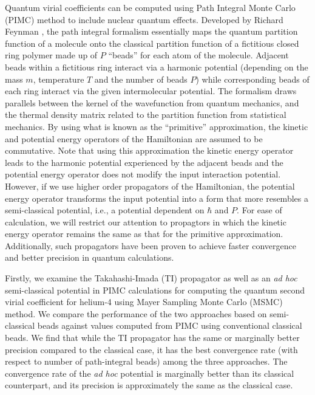 Quantum virial coefficients can be computed using Path Integral Monte Carlo (PIMC) method to include nuclear quantum effects. Developed by Richard Feynman \cite{Feynman}, the path integral formalism essentially maps the quantum partition function of a molecule onto the classical partition function of a fictitious closed ring polymer made up of $P$ ``beads'' for each atom of the molecule. Adjacent beads within a fictitious ring interact via a harmonic potential (depending on the mass $m$, temperature $T$ and the number of beads $P$) while corresponding beads of each ring interact via the given intermolecular potential. The formalism draws parallels between the kernel of the wavefunction from quantum mechanics, and the thermal density matrix related to the partition function from statistical mechanics. By using what is known as the ``primitive'' approximation, the kinetic and potential energy operators of the Hamiltonian are assumed to be commutative. Note that using this approximation the kinetic energy operator leads to the harmonic potential experienced by the adjacent beads and the potential energy operator does not modify the input interaction potential. However, if we use higher order propagators of the Hamiltonian, the potential energy operator transforms the input potential into a form that more resembles a semi-classical potential, i.e., a potential dependent on $\hbar$ and $P$. For ease of calculation, we will restrict our attention to propagtors in which the kinetic energy operator remains the same as that for the primitive approximation. Additionally, such propagators have been proven to achieve faster convergence and better precision in quantum calculations. 

Firstly, we examine the Takahashi-Imada \cite{Takahashi1984} (TI) propagator as well as an \emph{ad hoc} semi-classical potential in PIMC calculations for computing the quantum second virial coefficient for helium-4 using Mayer Sampling Monte Carlo \cite{Singh2004} (MSMC) method. We compare the performance of the two approaches based on semi-classical beads against values computed from PIMC using conventional classical beads. We find that while the TI propagator has the same or marginally better precision compared to the classical case, it has the best convergence rate (with respect to number of path-integral beads) among the three approaches. The convergence rate of the \emph{ad hoc} potential is marginally better than its classical counterpart, and its precision is approximately the same as the classical case.

